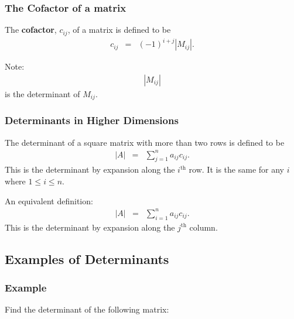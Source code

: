 \begin{frame}
  \frametitle{The Cofactor of a matrix}

  The \textbf{cofactor}, $c_{ij}$, of a matrix is defined to be
  \begin{eqnarray*}
    c_{ij} & = & (-1)^{i+j}\left| M_{ij} \right|.
  \end{eqnarray*}

  Note:
  \begin{eqnarray*}
    \left| M_{ij} \right|
  \end{eqnarray*}
  is the determinant of $M_{ij}$.

\end{frame}


\begin{frame}
  \frametitle{Determinants in Higher Dimensions}

  The determinant of a square matrix with more than two rows is
  defined to be
  \begin{eqnarray*}
    \left| A \right| & = & \sum^n_{j=1} a_{ij} c_{ij}.
  \end{eqnarray*}
  This is the determinant by expansion along the $i^{\mathrm{th}}$
  row. It is the same for any $i$ where $1\leq i \leq n$.

  An equivalent definition:
  \begin{eqnarray*}
    \left| A \right| & = & \sum^n_{i=1} a_{ij} c_{ij}.
  \end{eqnarray*}
  This is the determinant by expansion along the $j^{\mathrm{th}}$
  column.



\end{frame}


\subsection{Examples of Determinants}

\begin{frame}
  \frametitle{Example}

  Find the determinant of the following matrix:





\end{frame}

